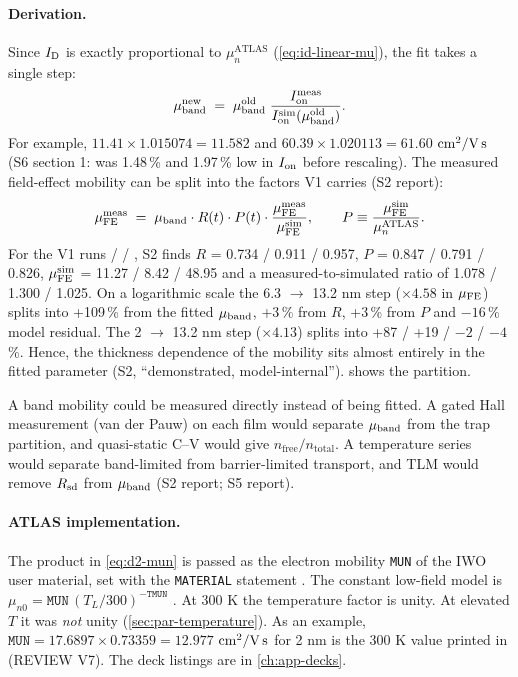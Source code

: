 \paragraph{Derivation.}
Since $I_{\mathrm{D}}$ is exactly proportional to $\mu_n^{\mathrm{ATLAS}}$ (\cref{eq:id-linear-mu}), the fit takes a single step:
\begin{equation}
  \mu_{\mathrm{band}}^{\mathrm{new}} \;=\; \mu_{\mathrm{band}}^{\mathrm{old}}\;\frac{I_{\mathrm{on}}^{\mathrm{meas}}}{I_{\mathrm{on}}^{\mathrm{sim}}(\mu_{\mathrm{band}}^{\mathrm{old}})}.
  \label{eq:d2-mu-rescale}
\end{equation}
For example, $11.41\times1.015074 = 11.582$ and $60.39\times1.020113 = 61.60$\,$\,\mathrm{cm}^{2}/\mathrm{V\,s}$ (S6 section 1:  was 1.48\,\% and  1.97\,\% low in $I_{\mathrm{on}}$ before rescaling). The measured field-effect mobility can be split into the factors V1 carries (S2 report):
\begin{equation}
  \mu_{\mathrm{FE}}^{\mathrm{meas}} \;=\; \mu_{\mathrm{band}} \cdot R(t) \cdot P(t) \cdot \frac{\mu_{\mathrm{FE}}^{\mathrm{meas}}}{\mu_{\mathrm{FE}}^{\mathrm{sim}}},
  \qquad P \equiv \frac{\mu_{\mathrm{FE}}^{\mathrm{sim}}}{\mu_n^{\mathrm{ATLAS}}}.
  \label{eq:d2-mu-decomposition}
\end{equation}
For the V1 runs  /  / , S2 finds $R$ = 0.734 / 0.911 / 0.957, $P$ = 0.847 / 0.791 / 0.826, $\mu_{\mathrm{FE}}^{\mathrm{sim}}$ = 11.27 / 8.42 / 48.95 and a measured-to-simulated ratio of 1.078 / 1.300 / 1.025. On a logarithmic scale the 6.3 $\rightarrow$ 13.2 nm step ($\times 4.58$ in $\mu_{\mathrm{FE}}$) splits into +109\,\% from the fitted $\mu_{\mathrm{band}}$, +3\,\% from $R$, +3\,\% from $P$ and $-16$\,\% model residual. The 2 $\rightarrow$ 13.2 nm step ($\times 4.13$) splits into +87 / +19 / $-2$ / $-4$\,\%. Hence, the thickness dependence of the mobility sits almost entirely in the fitted parameter (S2, ``demonstrated, model-internal'').  shows the partition.

A band mobility could be measured directly instead of being fitted. A gated Hall measurement (van der Pauw) on each film would separate $\mu_{\mathrm{band}}$ from the trap partition, and quasi-static C--V would give $n_{\mathrm{free}}/n_{\mathrm{total}}$. A temperature series would separate band-limited from barrier-limited transport, and TLM would remove $R_{\mathrm{sd}}$ from $\mu_{\mathrm{band}}$ (S2 report; S5 report).

\paragraph{ATLAS implementation.}
The product in \cref{eq:d2-mun} is passed as the electron mobility \texttt{MUN} of the IWO user material, set with the \texttt{MATERIAL} statement \citep[p.~1343]{AtlasManual}. The constant low-field model is $\mu_{n0} = \texttt{MUN}\,(T_L/300)^{-\texttt{TMUN}}$ \citep[p.~179, Eq.~3-215]{AtlasManual}. At 300 K the temperature factor is unity. At elevated $T$ it was \emph{not} unity (\cref{sec:par-temperature}). As an example, $\texttt{MUN}=17.6897\times0.73359 = 12.977$\,$\,\mathrm{cm}^{2}/\mathrm{V\,s}$ for 2 nm is the 300 K value printed in  (REVIEW V7). The deck listings are in \cref{ch:app-decks}.

